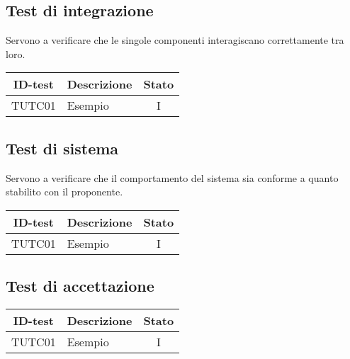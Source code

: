 \subsection{Test di integrazione}
Servono a verificare che le singole componenti interagiscano correttamente tra loro.
\begin{tabular}{|c|p{4cm}|c|}
    \hline
    \textbf{ID-test} & \textbf{Descrizione} & \textbf{Stato} \\
    \hline
    TUTC01 & Esempio & I  \\
    \hline
\end{tabular}

\subsection{Test di sistema}
Servono a verificare che il comportamento del sistema sia conforme a quanto stabilito con il proponente.

\begin{tabular}{|c|p{4cm}|c|}
    \hline
    \textbf{ID-test} & \textbf{Descrizione} & \textbf{Stato} \\
    \hline
    TUTC01 & Esempio & I \\
    \hline
\end{tabular}

\subsection{Test di accettazione}

\begin{tabular}{|c|p{4cm}|c|}
    \hline
    \textbf{ID-test} & \textbf{Descrizione} & \textbf{Stato} \\
    \hline
    TUTC01 & Esempio & I \\
    \hline
\end{tabular}
